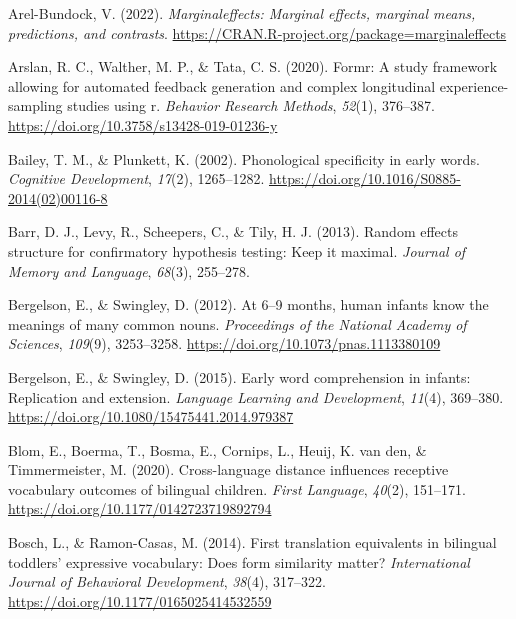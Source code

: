 \documentclass[
]{article}
\newlength{\cslhangindent}
\newlength{\cslentryspacingunit} %
\newenvironment{CSLReferences}[2] %
 {%
  \setlength{\parindent}{0pt}
  \ifodd #1
  \let\oldpar\par
  \def\par{\hangindent=\cslhangindent\oldpar}
  \fi
  \setlength{\parskip}{#2\cslentryspacingunit}
 }%
 {}
\begin{document}
\hypertarget{refs}{}
\begin{CSLReferences}{1}{0}
\leavevmode{}%
Arel-Bundock, V. (2022). \emph{Marginaleffects: Marginal effects,
marginal means, predictions, and contrasts}.
\url{https://CRAN.R-project.org/package=marginaleffects}

\leavevmode{}%
Arslan, R. C., Walther, M. P., \& Tata, C. S. (2020). Formr: A study
framework allowing for automated feedback generation and complex
longitudinal experience-sampling studies using r. \emph{Behavior
Research Methods}, \emph{52}(1), 376--387.
\url{https://doi.org/10.3758/s13428-019-01236-y}

\leavevmode{}%
Bailey, T. M., \& Plunkett, K. (2002). Phonological specificity in early
words. \emph{Cognitive Development}, \emph{17}(2), 1265--1282.
\url{https://doi.org/10.1016/S0885-2014(02)00116-8}

\leavevmode{}%
Barr, D. J., Levy, R., Scheepers, C., \& Tily, H. J. (2013). Random
effects structure for confirmatory hypothesis testing: Keep it maximal.
\emph{Journal of Memory and Language}, \emph{68}(3), 255--278.

\leavevmode{}%
Bergelson, E., \& Swingley, D. (2012). At 6--9 months, human infants
know the meanings of many common nouns. \emph{Proceedings of the
National Academy of Sciences}, \emph{109}(9), 3253--3258.
\url{https://doi.org/10.1073/pnas.1113380109}

\leavevmode{}%
Bergelson, E., \& Swingley, D. (2015). Early word comprehension in
infants: Replication and extension. \emph{Language Learning and
Development}, \emph{11}(4), 369--380.
\url{https://doi.org/10.1080/15475441.2014.979387}

\leavevmode{}%
Blom, E., Boerma, T., Bosma, E., Cornips, L., Heuij, K. van den, \&
Timmermeister, M. (2020). Cross-language distance influences receptive
vocabulary outcomes of bilingual children. \emph{First Language},
\emph{40}(2), 151--171. \url{https://doi.org/10.1177/0142723719892794}

\leavevmode{}%
Bosch, L., \& Ramon-Casas, M. (2014). First translation equivalents in
bilingual toddlers' expressive vocabulary: Does form similarity matter?
\emph{International Journal of Behavioral Development}, \emph{38}(4),
317--322. \url{https://doi.org/10.1177/0165025414532559}


\end{CSLReferences}
\end{document}
